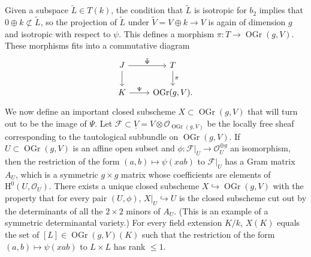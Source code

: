 \documentclass{article} %
\numberwithin{equation}{section}
\newcommand{\sh}[1]{\mathscr{#1}}
\renewcommand{\O}{\mathcal{O}}
\newcommand{\HH}{\mathrm{H}}
\newcommand{\cO}{\mathcal{O}}
\DeclareMathOperator{\OGr}{OGr}
\begin{document}
Given a subspace $\tilde{L}\in T(k)$, the condition that $\tilde{L}$ is isotropic for $b_2$ implies that $0 \oplus k\not\subset \tilde{L}$, so the projection of $\tilde{L}$ under $\tilde{V} = V \oplus k \rightarrow V$ is again of dimension $g$ and isotropic with respect to $\psi$.
This defines a morphism $\pi\colon T\rightarrow \OGr(g,V)$.
These morphisms fits into a commutative diagram 
\begin{equation} \label{diagram_psiandpsitilde}
\begin{tikzcd}
	J & T \\
	K & {\OGr(g,V)}.
	\arrow["{\tilde{\Psi}}", from=1-1, to=1-2]
	\arrow[from=1-1, to=2-1]
	\arrow["\pi", from=1-2, to=2-2]
	\arrow["{\Psi}", from=2-1, to=2-2]
\end{tikzcd}
\end{equation}
We now define an important closed subscheme $X\subset \OGr(g,V)$ that will turn out to be the image of $\Psi$.
Let $\sh{F} \subset \underline{V} = V \otimes \cO_{\OGr(g, V)}$ be the locally free sheaf corresponding to the tautological subbundle on $\OGr(g, V)$.
If $U\subset \OGr(g,V)$ is an affine open subset and $\phi\colon \sh{F}|_U \rightarrow \O_U^{\oplus g}$ an isomorphism, then the restriction of the form $(a,b)\mapsto \psi(xab)$ to $\sh{F}|_U$ has a Gram matrix $A_U$, which is a symmetric $g\times g$ matrix whose coefficients are elements of $\HH^0(U, \O_U)$.
There exists a unique closed subscheme $X\hookrightarrow \OGr(g,V)$ with the property that for every pair $(U, \phi)$, $X|_U\hookrightarrow U$ is the closed subscheme cut out by the determinants of all the $2\times 2$ minors of $A_U$. (This is an example of a symmetric determinantal variety.)
For every field extension $K/k$, $X(K)$ equals the set of $[L] \in \OGr(g,V)(K)$ such that the restriction of the form $(a, b)\mapsto \psi(xab)$ to $L\times L$ has rank $\leq 1$.
\end{document}

